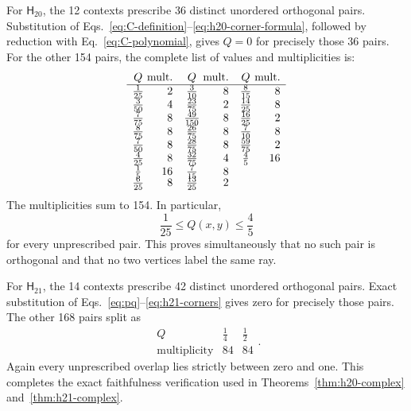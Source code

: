 \documentclass[twocolumn,aps,pra,floatfix,amsmath,amssymb,longbibliography]{revtex4-2}
\theoremstyle{definition}
\theoremstyle{remark}
\newcommand{\Htwenty}{\mathsf H_{20}}
\newcommand{\Htwentyone}{\mathsf H_{21}}
\begin{document}
For $\Htwenty$, the 12 contexts prescribe 36 distinct unordered
orthogonal pairs.  Substitution of
Eqs.~\eqref{eq:C-definition}--\eqref{eq:h20-corner-formula}, followed by
reduction with Eq.~\eqref{eq:C-polynomial}, gives $Q=0$ for precisely
those 36 pairs.  For the other 154 pairs, the complete list of values
and multiplicities is:
\begin{equation}
\begin{array}{c@{\;}r@{\quad}c@{\;}r@{\quad}c@{\;}r}
 Q&\text{mult.}&Q&\text{mult.}&Q&\text{mult.}\\ \hline
 \frac1{25}&2&\frac3{10}&8&\frac8{15}&8\\
 \frac3{50}&4&\frac{23}{75}&2&\frac{14}{25}&8\\
 \frac7{75}&8&\frac{49}{150}&8&\frac{16}{25}&2\\
 \frac8{75}&8&\frac{26}{75}&8&\frac7{10}&8\\
 \frac7{50}&8&\frac{28}{75}&8&\frac{59}{75}&2\\
 \frac4{25}&8&\frac{32}{75}&4&\frac45&16\\
 \frac15&16&\frac7{15}&8&&\\[-2pt]
 \frac6{25}&8&\frac{13}{25}&2&&
\end{array}
\label{eq:H20-Q-table}
\end{equation}
The multiplicities sum to 154.  In particular,
\begin{equation}
 \frac1{25}\le Q(x,y)\le\frac45
 \label{eq:H20-Q-bounds}
\end{equation}
for every unprescribed pair.  This proves simultaneously that no such
pair is orthogonal and that no two vertices label the same ray.

For $\Htwentyone$, the 14 contexts prescribe 42 distinct unordered
orthogonal pairs.  Exact substitution of
Eqs.~\eqref{eq:pq}--\eqref{eq:h21-corners} gives zero for
precisely those pairs.  The other 168 pairs split as
\begin{equation}
 \begin{array}{c|cc}
 Q&\frac14&\frac12\\ \hline
 \text{multiplicity}&84&84
 \end{array}.
 \label{eq:H21-Q-table}
\end{equation}
Again every unprescribed overlap lies strictly between zero and one.
This completes the exact faithfulness verification used in
Theorems~\ref{thm:h20-complex} and~\ref{thm:h21-complex}.
\end{document}
